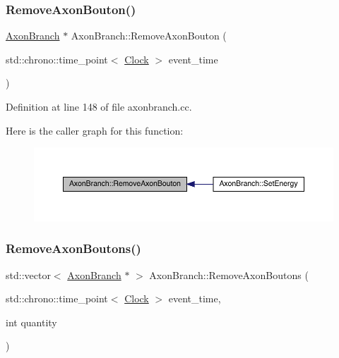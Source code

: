 \subsubsection{\texorpdfstring{Remove\+Axon\+Bouton()}{RemoveAxonBouton()}}
{\footnotesize\ttfamily \hyperlink{class_axon_branch}{Axon\+Branch} $\ast$ Axon\+Branch\+::\+Remove\+Axon\+Bouton (\begin{DoxyParamCaption}\item[{std\+::chrono\+::time\+\_\+point$<$ \hyperlink{universe_8h_a0ef8d951d1ca5ab3cfaf7ab4c7a6fd80}{Clock} $>$}]{event\+\_\+time }\end{DoxyParamCaption})}



Definition at line 148 of file axonbranch.\+cc.

Here is the caller graph for this function\+:
\nopagebreak
\begin{figure}[H]
\begin{center}
\leavevmode
\includegraphics[width=350pt]{class_axon_branch_a06753a2a61941a59d86510e51ba44b15_icgraph}
\end{center}
\end{figure}
\mbox{\label{class_axon_branch_a815e055e37f89fb2627b250c5b95d406}} 
\subsubsection{\texorpdfstring{Remove\+Axon\+Boutons()}{RemoveAxonBoutons()}}
{\footnotesize\ttfamily std\+::vector$<$ \hyperlink{class_axon_branch}{Axon\+Branch} $\ast$ $>$ Axon\+Branch\+::\+Remove\+Axon\+Boutons (\begin{DoxyParamCaption}\item[{std\+::chrono\+::time\+\_\+point$<$ \hyperlink{universe_8h_a0ef8d951d1ca5ab3cfaf7ab4c7a6fd80}{Clock} $>$}]{event\+\_\+time,  }\item[{int}]{quantity }\end{DoxyParamCaption})}



